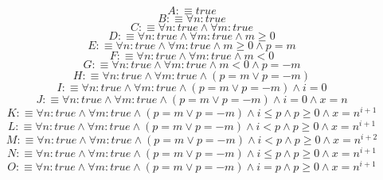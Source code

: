 $$ A:\equiv true $$
$$ B:\equiv \forall n:true $$
$$ C:\equiv \forall n:true \land \forall m:true $$
$$ D:\equiv \forall n:true \land \forall m:true \land m \geq 0 $$
$$ E:\equiv \forall n:true \land \forall m:true \land m \geq 0 \land p = m $$
$$ F:\equiv \forall n:true \land \forall m:true \land m<0 $$
$$ G:\equiv \forall n:true \land \forall m:true \land m<0 \land p=-m $$
$$ H:\equiv \forall n:true \land \forall m:true \land (p=m \lor p=-m) $$
$$ I:\equiv \forall n:true \land \forall m:true \land (p=m \lor p=-m) \land i=0 $$
$$ J:\equiv \forall n:true \land \forall m:true \land (p=m \lor p=-m) \land i=0 \land x=n $$
$$ K:\equiv \forall n:true \land \forall m:true \land (p=m \lor p=-m) \land i \leq p \land p \geq 0 \land x=n^{i+1} $$
$$ L:\equiv \forall n:true \land \forall m:true \land (p=m \lor p=-m) \land i<p \land p \geq 0 \land x=n^{i+1} $$
$$ M:\equiv \forall n:true \land \forall m:true \land (p=m \lor p=-m) \land i<p \land p \geq 0 \land x=n^{i+2} $$
$$ N:\equiv \forall n:true \land \forall m:true \land (p=m \lor p=-m) \land i \leq p \land p \geq 0 \land x=n^{i+1} $$
$$ O:\equiv \forall n:true \land \forall m:true \land (p=m \lor p=-m) \land i=p \land p \geq 0 \land x=n^{i+1} $$
\bye
